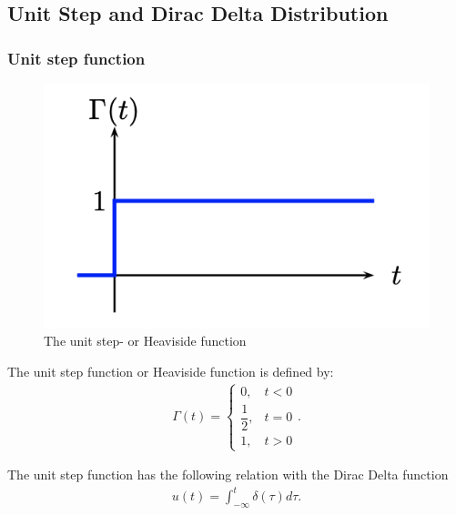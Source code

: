 \subsection{Unit Step and Dirac Delta Distribution}
\subsubsection{Unit step function}
\begin{figure}[H]
    \centering
    \includegraphics[scale=0.6]{figures/unit_step_func.png}
    \caption{The unit step- or Heaviside function}
    \label{fig:unit_step_function}
\end{figure}

The unit step function or Heaviside function is defined by:
\begin{align*}
\Gamma(t) =
    \begin{cases}
    0,& t<0\\
    \dfrac{1}{2}, & t=0\\
    1, & t>0
\end{cases}.
\end{align*}


\noindent The unit step function has the following relation with the Dirac Delta function
\begin{align*}
 u(t)=\int_{-\infty}^{t}\delta(\tau)d\tau. 
\end{align*}


